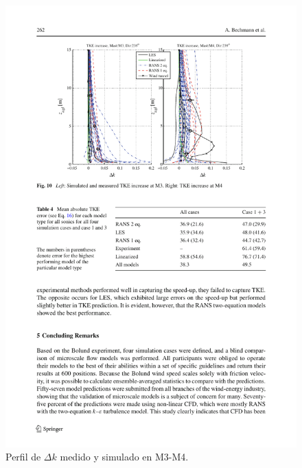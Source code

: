 \documentclass[mathserif,10pt]{beamer}
\begin{document}
\begin{frame}{}
	\begin{figure}[H]
		\centering	
		\includegraphics[width=1\linewidth,trim={2.7cm 14.3cm 1.9cm 2cm},clip]{fig/an1/bolund5.pdf}%
		\caption{Perfil de $\Delta k$ medido y simulado en M3-M4.}
		\label{fig:an1_delta_tke_mast2}
	\end{figure}
\end{frame}
\end{document}
